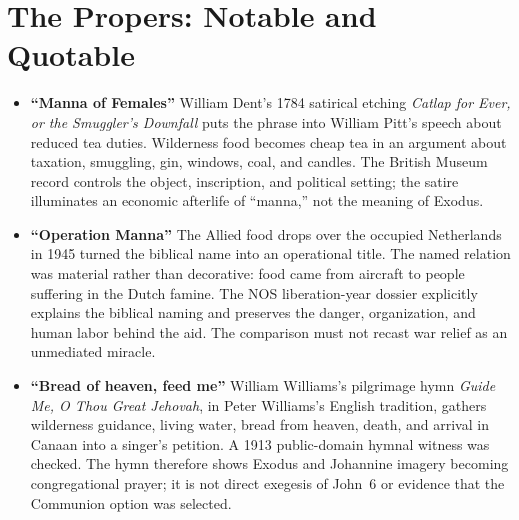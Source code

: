 \section*{The Propers: Notable and Quotable}

\begin{itemize}
\item \textbf{“Manna of Females”\enspace{}} William Dent's 1784 satirical etching \emph{Catlap for
Ever, or the Smuggler's Downfall} puts the phrase into William Pitt's speech
about reduced tea duties. Wilderness food becomes cheap tea in an argument
about taxation, smuggling, gin, windows, coal, and candles. The British Museum
record controls the object, inscription, and political setting; the satire
illuminates an economic afterlife of “manna,” not the meaning of Exodus.

\item \textbf{“Operation Manna”\enspace{}} The Allied food drops over the occupied Netherlands in
1945 turned the biblical name into an operational title. The named relation
was material rather than decorative: food came from aircraft to people
suffering in the Dutch famine. The NOS liberation-year dossier explicitly
explains the biblical naming and preserves the danger, organization, and
human labor behind the aid. The comparison must not recast war relief as an
unmediated miracle.

\item \textbf{“Bread of heaven, feed me”\enspace{}} William Williams's pilgrimage hymn \emph{Guide Me, O Thou Great
Jehovah}, in Peter Williams's English tradition, gathers wilderness guidance,
living water, bread from heaven, death, and arrival in Canaan into a singer's
petition. A 1913 public-domain hymnal witness was checked. The hymn therefore
shows Exodus and Johannine imagery becoming congregational prayer; it is not
direct exegesis of John~6 or evidence that the Communion option was selected.
\end{itemize}
